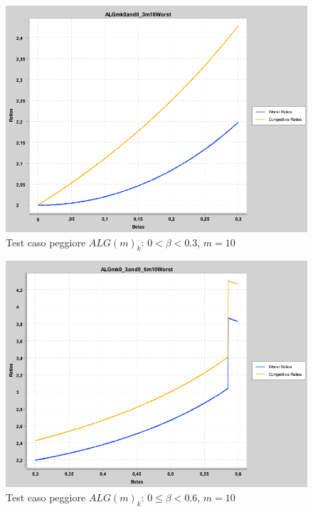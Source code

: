 \documentclass[twoside,openany,titlepage,fleqn,
	headinclude,12pt,a4paper,BCOR5mm,footinclude]{scrbook}
\begin{document}
\begin{figure}[H]
\caption[Test caso peggiore $ALG(m)_{k}$: $0 < \beta < 0.3$]{Test caso peggiore $ALG(m)_{k}$: $0 < \beta < 0.3$, $m = 10$}
\centering
\includegraphics[scale=0.4]{worst/ALGmk0and0_3m10Worst.png}
\end{figure}
\begin{figure}[H]
\caption[Test caso peggiore $ALG(m)_{k}$: $0 \leq \beta < 0.6$]{Test caso peggiore $ALG(m)_{k}$: $0 \leq \beta < 0.6$, $m = 10$}
\centering
\includegraphics[scale=0.4]{worst/ALGmk0_3and0_6m10Worst.png}
\end{figure}
\end{document}
